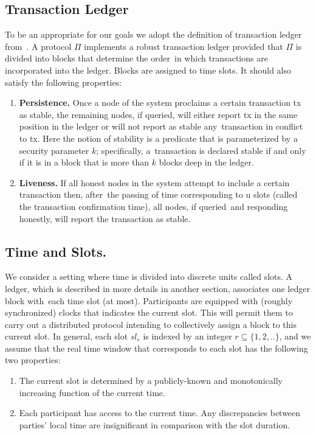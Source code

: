 \subsection{Transaction Ledger}\label{subsec:transaction-ledger}

To be an appropriate for our goals we adopt the definition of transaction ledger from~\cite{cryptoeprint:2016/889}.
A protocol $\Pi$ implements a robust transaction ledger provided that $\Pi$ is divided into blocks that determine the order\
in which transactions are incorporated into the ledger.
Blocks are assigned to time slots.
It should also satisfy the following properties:
\begin{enumerate}
    \item \textbf{Persistence.} Once a node of the system proclaims a certain transaction tx as stable, the remaining
    nodes, if queried, will either report tx in the same position in the ledger or will not report as stable any\
    transaction in conflict to tx.
    Here the notion of stability is a predicate that is parameterized by a security parameter $k$; specifically, a\
    transaction is declared stable if and only if it is in a block that is more than $k$ blocks deep in the ledger.
    \item \textbf{Liveness.} If all honest nodes in the system attempt to include a certain transaction then, after\
    the passing of time corresponding to u slots (called the transaction confirmation time), all nodes, if queried\
    and responding honestly, will report the transaction as stable.
\end{enumerate}

\subsection{Time and Slots.}\label{subsec:time-and-slots.}
We consider a setting where time is divided into discrete units called slots.
A ledger, which is described in more details in another section, associates one ledger block with\
each time slot (at most).
Participants are equipped with (roughly synchronized) clocks that indicates the current slot.
This will permit them to carry out a distributed protocol intending to collectively assign a block to this current
slot.
In general, each slot $sl_r$ is indexed by an integer $r \subseteq \{1, 2, ..\}$, and we assume that the real
time window that corresponds to each slot has the following two properties:
\begin{enumerate}
    \item The current slot is determined by a publicly-known and monotonically increasing function of the current time.
    \item Each participant has access to the current time.
    Any discrepancies between parties' local time are insignificant in comparison with the slot duration.
\end{enumerate}

